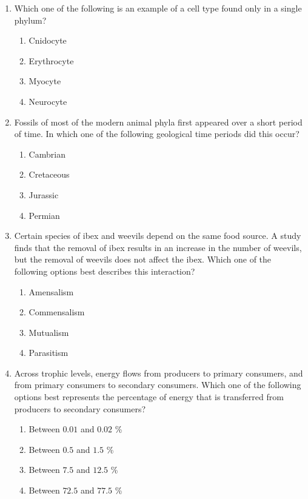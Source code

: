 \documentclass[journal]{IEEEtran}
\begin{document}
\begin{enumerate}
    \item Which one of the following is an example of a cell type found only in a single phylum?
\begin{multicols}{2}
    \begin{enumerate}
        \item Cnidocyte
        \item Erythrocyte
        \item Myocyte
        \item Neurocyte
    \end{enumerate}
    \end{multicols}
    
    \item Fossils of most of the modern animal phyla first appeared over a short period of time.
In which one of the following geological time periods did this occur?
\begin{multicols}{2}
    \begin{enumerate}
        \item Cambrian
        \item Cretaceous
        \item Jurassic
        \item Permian
    \end{enumerate}
    \end{multicols}
    
    \item Certain species of ibex and weevils depend on the same food source.
A study finds that the removal of ibex results in an increase in the number of weevils, but the removal of weevils does not affect the ibex.
Which one of the following options best describes this interaction?
\begin{multicols}{2}
    \begin{enumerate}
        \item Amensalism
        \item Commensalism
        \item Mutualism
        \item Parasitism
    \end{enumerate}
    \end{multicols}
    
    \item Across trophic levels, energy flows from producers to primary consumers, and from primary consumers to secondary consumers.
Which one of the following options best represents the percentage of energy that is transferred from producers to secondary consumers?
\begin{enumerate}
        \item Between $0.01$ and $0.02$ \%
        \item Between $0.5$ and $1.5$ \%
        \item Between $7.5$ and $12.5$ \%
        \item Between $72.5$ and $77.5$ \%
    \end{enumerate}
    

\end{enumerate}
\end{document}
